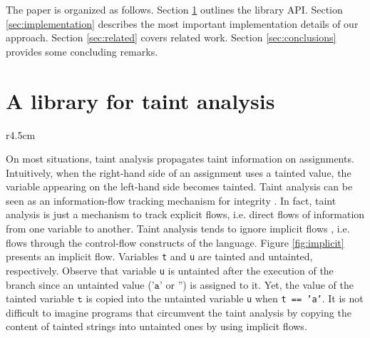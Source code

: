 \documentclass[oribibl]{llncs}
\begin{document}
  

 
The paper is organized as follows.
Section \ref{sec:library} outlines the library API.
Section \ref{sec:implementation} 
describes the most important implementation details of our approach.
Section \ref{sec:related} covers related work.  
Section \ref{sec:conclusions} provides some 
concluding remarks. 






\section{A library for taint analysis}
\label{sec:library}

\begin{wrapfigure}{r}{4.5cm}
\vspace{-30pt}
{\small{

\caption{\label{fig:implicit}An implicit flow}
}}
\vspace{-20pt}
\end{wrapfigure}



On most situations, taint analysis %
propagates 
taint information on assignments.  
Intuitively, when the right-hand side of an assignment uses a tainted value, 
the variable appearing on the left-hand side becomes tainted.
Taint analysis can be seen as an information-flow tracking 
mechanism for integrity \cite{Sabelfeld:Myers:JSAC}. 
In fact, taint analysis is just a mechanism to 
track explicit flows, i.e. direct flows of information 
from one variable to another. 
Taint analysis tends to ignore 
implicit flows \cite{Denning:Denning:Certification}, i.e. 
flows through the control-flow constructs of the language. 
Figure \ref{fig:implicit} presents an implicit 
flow. Variables \texttt{t} and \texttt{u} are 
tainted and untainted, respectively.
Observe that variable \texttt{u} 
is untainted after the execution of the branch since 
an untainted value ($\texttt{'a'}$ or
$\texttt{''}$) is assigned to it. Yet, the value of the tainted variable 
$\texttt{t}$ is copied into the untainted variable 
\texttt{u} when \texttt{t == 'a'}. 
It is not difficult to imagine 
programs that circumvent the taint analysis by
copying the content of tainted strings 
into untainted ones  by using implicit flows\cite{Russo:IOS}.
\end{document}
